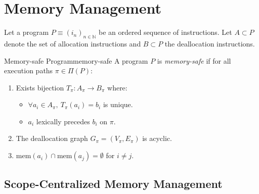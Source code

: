 \section{Memory Management}
\label{sec:Managing-Memory}

Let a program $ P \equiv (i_n)_{n \in \mathbb{N}} $ be an ordered sequence of instructions.
Let $ A \subset P $ denote the set of allocation instructions and $ B \subset P $ the deallocation instructions.

\begin{definition}{Memory-safe Program}{memory-safe}
	A program $P$ is \emph{memory-safe} if for all execution paths $\pi \in \Pi(P)$:
	\begin{enumerate}
		\item Exists bijection $T_\pi: A_\pi \rightarrow B_\pi$ where:
		      \begin{itemize}
			      \item $\forall a_i \in A_\pi,\ T_\pi(a_i) = b_i$ is unique.
			      \item $a_i$ lexically precedes $b_i$ on $\pi$.
		      \end{itemize}
		\item The deallocation graph $G_\pi = (V_\pi, E_\pi)$ is acyclic.
		\item $\text{mem}(a_i) \cap \text{mem}(a_j) = \emptyset$ for $i \neq j$.
	\end{enumerate}
\end{definition}

\subsection{Scope-Centralized Memory Management}
\label{subsec:Scope-Centralized-Memory-Management}

